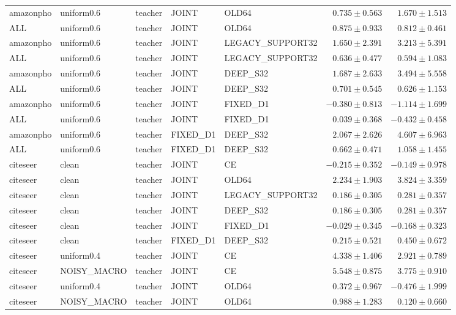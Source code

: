 \begin{longtable}{lllllrr}
amazonpho & uniform0.6 & teacher & JOINT & OLD64 & $0.735 \pm 0.563$ & $1.670 \pm 1.513$ \\
ALL & uniform0.6 & teacher & JOINT & OLD64 & $0.875 \pm 0.933$ & $0.812 \pm 0.461$ \\
amazonpho & uniform0.6 & teacher & JOINT & LEGACY\_SUPPORT32 & $1.650 \pm 2.391$ & $3.213 \pm 5.391$ \\
ALL & uniform0.6 & teacher & JOINT & LEGACY\_SUPPORT32 & $0.636 \pm 0.477$ & $0.594 \pm 1.083$ \\
amazonpho & uniform0.6 & teacher & JOINT & DEEP\_S32 & $1.687 \pm 2.633$ & $3.494 \pm 5.558$ \\
ALL & uniform0.6 & teacher & JOINT & DEEP\_S32 & $0.701 \pm 0.545$ & $0.626 \pm 1.153$ \\
amazonpho & uniform0.6 & teacher & JOINT & FIXED\_D1 & $-0.380 \pm 0.813$ & $-1.114 \pm 1.699$ \\
ALL & uniform0.6 & teacher & JOINT & FIXED\_D1 & $0.039 \pm 0.368$ & $-0.432 \pm 0.458$ \\
amazonpho & uniform0.6 & teacher & FIXED\_D1 & DEEP\_S32 & $2.067 \pm 2.626$ & $4.607 \pm 6.963$ \\
ALL & uniform0.6 & teacher & FIXED\_D1 & DEEP\_S32 & $0.662 \pm 0.471$ & $1.058 \pm 1.455$ \\
citeseer & clean & teacher & JOINT & CE & $-0.215 \pm 0.352$ & $-0.149 \pm 0.978$ \\
citeseer & clean & teacher & JOINT & OLD64 & $2.234 \pm 1.903$ & $3.824 \pm 3.359$ \\
citeseer & clean & teacher & JOINT & LEGACY\_SUPPORT32 & $0.186 \pm 0.305$ & $0.281 \pm 0.357$ \\
citeseer & clean & teacher & JOINT & DEEP\_S32 & $0.186 \pm 0.305$ & $0.281 \pm 0.357$ \\
citeseer & clean & teacher & JOINT & FIXED\_D1 & $-0.029 \pm 0.345$ & $-0.168 \pm 0.323$ \\
citeseer & clean & teacher & FIXED\_D1 & DEEP\_S32 & $0.215 \pm 0.521$ & $0.450 \pm 0.672$ \\
citeseer & uniform0.4 & teacher & JOINT & CE & $4.338 \pm 1.406$ & $2.921 \pm 0.789$ \\
citeseer & NOISY\_MACRO & teacher & JOINT & CE & $5.548 \pm 0.875$ & $3.775 \pm 0.910$ \\
citeseer & uniform0.4 & teacher & JOINT & OLD64 & $0.372 \pm 0.967$ & $-0.476 \pm 1.999$ \\
citeseer & NOISY\_MACRO & teacher & JOINT & OLD64 & $0.988 \pm 1.283$ & $0.120 \pm 0.660$ \\

\end{longtable}
